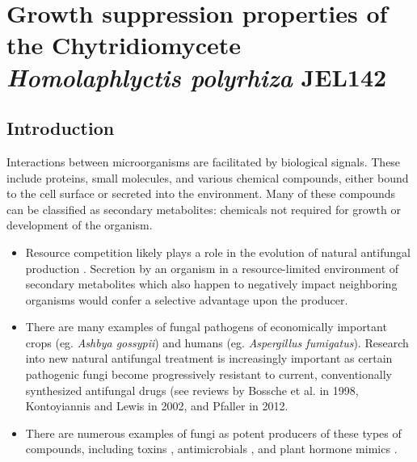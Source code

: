 ﻿%
\chapter{Growth suppression properties of the Chytridiomycete \textit{Homolaphlyctis polyrhiza} JEL142}
\label{chap:HpInhibition}
\section{Introduction}
Interactions between microorganisms are facilitated by biological signals. These include proteins, small molecules, and various chemical compounds, either bound to the cell surface or secreted into the environment. Many of these compounds can be classified as secondary metabolites: chemicals not required for growth or development of the organism. \\
\begin{itemize}
  \item Resource competition likely plays a role in the evolution of natural antifungal production \cite{Vicente2003}. Secretion by an organism in a resource-limited environment of secondary metabolites which also happen to negatively impact neighboring organisms would confer a selective advantage upon the producer.\\
  \item There are many examples of fungal pathogens of economically important crops (eg. \textit{Ashbya gossypii}) and humans (eg. \textit{Aspergillus fumigatus}). Research into new natural antifungal treatment is increasingly important as certain pathogenic fungi become progressively resistant to current, conventionally synthesized antifungal drugs (see reviews by Bossche et al. in 1998\nocite{Bossche1998}, Kontoyiannis and Lewis in 2002\nocite{Kontoyiannis2002}, and Pfaller in 2012\nocite{Pfaller2012}. \\
  \item There are numerous examples of fungi as potent producers of these types of compounds, including toxins \cite{Kokkonen2010}, antimicrobials \cite{Wiemann2014}, and plant hormone mimics \cite{Howlett2006}.\\ 
\end{itemize}
